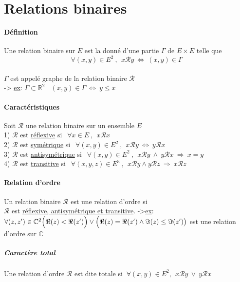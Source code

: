 	\section{Relations binaires}
		\traitd
		\paragraph{Définition}
			Une relation binaire sur $E$ est la donné d'une partie $\Gamma$ de $E\times E$ telle que \\
			\[ \forall (x,y) \in E^2 ~,~~x\mathcal{R} y ~\Leftrightarrow ~(x,y) \in \Gamma \] \vspace*{-0.7cm} \trait
		\vspace*{-1.1cm} \\ $\Gamma$ est appelé graphe de la relation binaire $\mathcal{R}$ 
		\\ -> \underline{ex}: $\Gamma \subset \mathbb{R}^2 ~~~~ (x,y) \in \Gamma ~\Leftrightarrow ~ y \leq x$ 
		\traitd
		\paragraph{Caractéristiques} Soit $\mathcal{R}$ une relation binaire sur un ensemble $E$
			\\ \hspace*{2.5cm} {\small 1)} $\mathcal{R}$ est \underline{réflexive} si $~~\forall x\in E ~,~~ x\mathcal{R} x$
			\\ \hspace*{2.5cm} {\small 2)} $\mathcal{R}$ est \underline{symétrique} si $~~\forall (x,y) \in E^2 ~,~~ x\mathcal{R} y 
			~\Leftrightarrow ~ y\mathcal{R} x$ \\ \hspace*{2.5cm} {\small 3)} $\mathcal{R}$ est \underline{antisymétrique} si $~~\forall (x,y) 
			\in E^2 ~,~~ x\mathcal{R} y ~\wedge ~y\mathcal{R} x ~\Rightarrow ~x=y$ \\ \hspace*{2.5cm} {\small 4)} $\mathcal{R}$ est 
			\underline{transitive} si $~~\forall (x,y,z) \in E^3 ~,~~ x\mathcal{R} y \wedge y\mathcal{R} z ~\Rightarrow ~ x\mathcal{R} z$ \trait
		\traitd
		\paragraph{Relation d'ordre}
			Un relation binaire $\mathcal{R}$ est une relation d'ordre si \\ $\mathcal{R}$ est \underline{réflexive, antisymétrique et transitive}.
			\trait
		->\underline{ex}: $\forall (z,z') \in \mathbb{C}^2 \\ \Big(\Re(z)<\Re(z')\Big) \vee \Big(\Re(z)=\Re(z') \wedge \Im(z)\leq\Im(z')\big) $ 
		est une relation d'ordre sur $\mathbb{C}$
		\subparagraph{Caractère total}
			Une relation d'ordre $\mathcal{R}$ est dite totale si $~\forall (x,y) \in E^2 ,~~ x\mathcal{R} y ~\vee ~y\mathcal{R} x$
		\traitd
